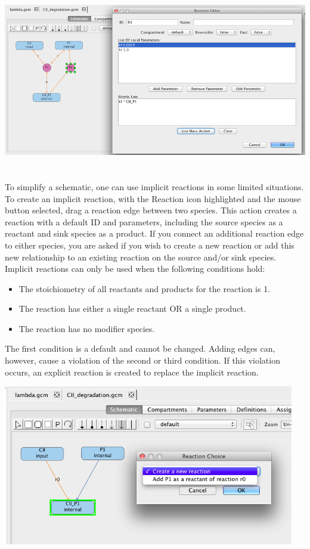 \documentclass[titlepage,11pt]{article}
\begin{document}
\begin{center}
\includegraphics[height=80mm]{screenshots/kineticLaw} 
\end{center}

To simplify a schematic, one can use implicit reactions in some limited situations.  To create an implicit reaction, with the Reaction icon highlighted and the mouse button selected, drag a reaction edge between two species.  This action creates a reaction with a default ID and parameters, including the source species as a reactant and sink species as a product.  If you connect an additional reaction edge to either species, you are asked if you wish to create a new reaction or add this new relationship to an existing reaction on the source and/or sink species.  Implicit reactions can only be used when the following conditions hold:
\begin{itemize}
\item The stoichiometry of all reactants and products for the reaction is 1.
\item The reaction has either a single reactant OR a single product.
\item The reaction has no modifier species.
\end{itemize}
The first condition is a default and cannot be changed.  Adding edges can, however, cause a violation of the second or third condition.  If this violation occurs, an explicit reaction is created to replace the implicit reaction.

\begin{center}
\includegraphics[height=70mm]{screenshots/implicitReactions} 
\end{center}
\end{document}
